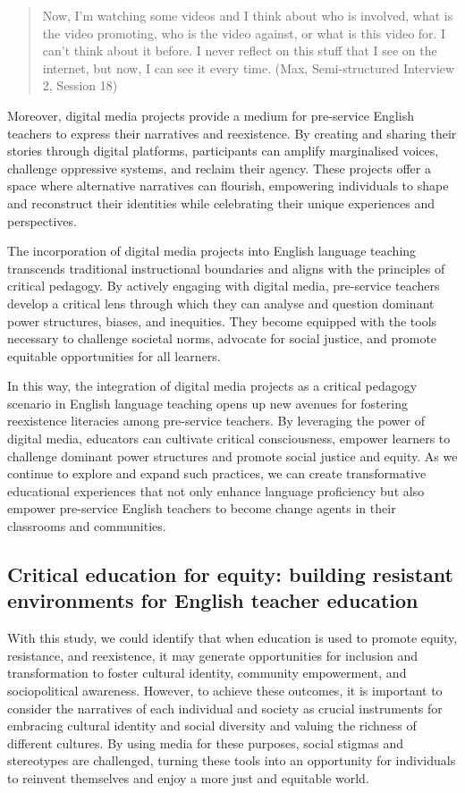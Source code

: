 \documentclass[english]{textolivre}
\begin{document}
\begin{quote}
    Now, I'm watching some videos and I think about who is involved, what is the video promoting, who is the video against, or what is this video for. I can’t think about it before. I never reflect on this stuff that I see on the internet, but now, I can see it every time. (Max, Semi-structured Interview 2, Session 18)
\end{quote}

Moreover, digital media projects provide a medium for pre-service English teachers to express their narratives and reexistence. By creating and sharing their stories through digital platforms, participants can amplify marginalised voices, challenge oppressive systems, and reclaim their agency. These projects offer a space where alternative narratives can flourish, empowering individuals to shape and reconstruct their identities while celebrating their unique experiences and perspectives.

The incorporation of digital media projects into English language teaching transcends traditional instructional boundaries and aligns with the principles of critical pedagogy. By actively engaging with digital media, pre-service teachers develop a critical lens through which they can analyse and question dominant power structures, biases, and inequities. They become equipped with the tools necessary to challenge societal norms, advocate for social justice, and promote equitable opportunities for all learners.

In this way, the integration of digital media projects as a critical pedagogy scenario in English language teaching opens up new avenues for fostering reexistence literacies among pre-service teachers. By leveraging the power of digital media, educators can cultivate critical consciousness, empower learners to challenge dominant power structures and promote social justice and equity. As we continue to explore and expand such practices, we can create transformative educational experiences that not only enhance language proficiency but also empower pre-service English teachers to become change agents in their classrooms and communities.

\subsection{Critical education for equity: building resistant environments for English teacher education}\label{sec-format-simple}
With this study, we could identify that when education is used to promote equity, resistance, and reexistence, it may generate opportunities for inclusion and transformation to foster cultural identity, community empowerment, and sociopolitical awareness. However, to achieve these outcomes, it is important to consider the narratives of each individual and society as crucial instruments for embracing cultural identity and social diversity and valuing the richness of different cultures. By using media for these purposes, social stigmas and stereotypes are challenged, turning these tools into an opportunity for individuals to reinvent themselves and enjoy a more just and equitable world.
\end{document}
